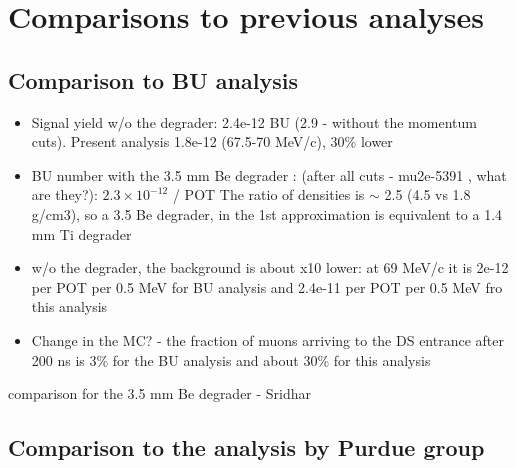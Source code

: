 \section{Comparisons to previous analyses} 

\subsection{Comparison to BU analysis}

\begin{itemize}
\item 
  Signal yield w/o the degrader: 2.4e-12 BU (2.9 - without the momentum cuts).
  Present analysis 1.8e-12 (67.5-70 MeV/c), 30\% lower
\item
  BU number with the 3.5 mm Be degrader : (after all cuts - mu2e-5391 ,
  what are they?): $2.3 \times 10^{-12}$ / POT 
  The ratio of densities is $\sim$ 2.5 (4.5 vs 1.8 g/cm3),
  so a 3.5 Be degrader, in the 1st approximation is equivalent to a 1.4 mm Ti degrader
\item
  w/o the degrader, the background is about x10 lower:
  at 69 MeV/c it is 2e-12 per POT per 0.5 MeV for BU analysis
  and 2.4e-11 per POT per 0.5 MeV fro this analysis
\item
  Change in the MC? - the fraction of muons arriving to the DS entrance after 200 ns
  is 3\% for the BU analysis and about 30\% for this analysis
\end{itemize}


{\red
  comparison for the 3.5 mm Be degrader - Sridhar
}


\subsection{Comparison to the analysis by Purdue group}

